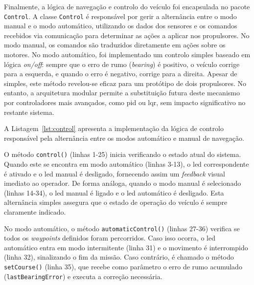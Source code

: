 

Finalmente, a lógica de navegação e controlo do veículo foi encapsulada no pacote \texttt{Control}. A classe \texttt{Control} é responsável por gerir a alternância entre o modo manual e o modo automático, utilizando os dados dos sensores e os comandos recebidos via comunicação para determinar as ações a aplicar nos propulsores. No modo manual, os comandos são traduzidos diretamente em ações sobre os motores. No modo automático, foi implementado um controlo simples baseado em lógica \emph{on/off}: sempre que o erro de rumo (\emph{bearing}) é positivo, o veículo corrige para a esquerda, e quando o erro é negativo, corrige para a direita. Apesar de simples, este método revelou-se eficaz para um protótipo de dois propulsores. No entanto, a arquitetura modular permite a substituição futura deste mecanismo por controladores mais avançados, como \acrfull{pid} ou \acrfull{lqr}, sem impacto significativo no restante sistema.  

A Listagem~\ref{lst:control} apresenta a implementação da lógica de controlo responsável pela alternância entre os modos automático e manual de navegação. 



O método \texttt{control()} (linhas 1-25) inicia verificando o estado atual do sistema. Quando este se encontra em modo automático (linhas 3-13), o \gls{led} correspondente é ativado e o \gls{led} manual é desligado, fornecendo assim um \emph{feedback} visual imediato ao operador. De forma análoga, quando o modo manual é selecionado (linhas 14-34), o \gls{led} manual é ligado e o \gls{led} automático é desligado. Esta alternância simples assegura que o estado de operação do veículo é sempre claramente indicado.  

No modo automático, o método \texttt{automaticControl()} (linhas 27-36) verifica se todos os \emph{waypoints} definidos foram percorridos. Caso isso ocorra, o \gls{led} automático entra em modo intermitente (linha 31) e o movimento é interrompido (linha 32), sinalizando o fim da missão. Caso contrário, é chamado o método \texttt{setCourse()} (linha 35), que recebe como parâmetro o erro de rumo acumulado (\texttt{lastBearingError}) e executa a correção necessária.  

